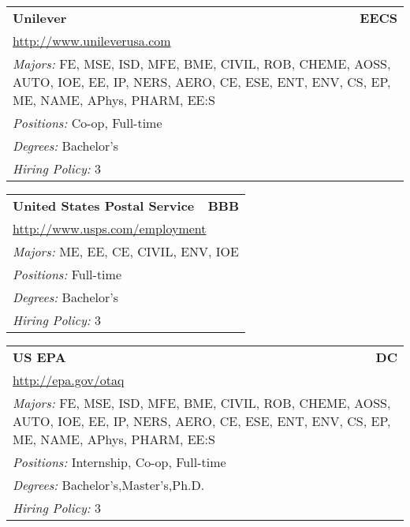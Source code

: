 \documentclass[twoside]{article}
\begin{document}
\begin{center}
\begin{multicols}{3}
\begin{FlushLeft}
\begin{minipage}{\columnwidth}\begin{tabularx}{.95\columnwidth}{Xr}
                 {\Large\bf Unilever} & {\Large\bf EECS}\\
    \multicolumn{2}{p{.95\columnwidth}}{\url{http://www.unileverusa.com}}\\
    \multicolumn{2}{p{.95\columnwidth}}{\emph{Majors:} FE, MSE, ISD, MFE, BME, CIVIL, ROB, CHEME, AOSS, AUTO, IOE, EE, IP, NERS, AERO, CE, ESE, ENT, ENV, CS, EP, ME, NAME, APhys, PHARM, EE:S}\\
    \multicolumn{2}{p{.95\columnwidth}}{\emph{Positions:} Co-op, Full-time}\\
    \multicolumn{2}{p{.95\columnwidth}}{\emph{Degrees:} Bachelor's}\\
    \multicolumn{2}{p{.95\columnwidth}}{\emph{Hiring Policy:} 3}\\
    \end{tabularx}
    
\end{minipage}
 
\begin{minipage}{\columnwidth}\begin{tabularx}{.95\columnwidth}{Xr}
                 {\Large\bf United States Postal Service} & {\Large\bf BBB}\\
    \multicolumn{2}{p{.95\columnwidth}}{\url{http://www.usps.com/employment}}\\
    \multicolumn{2}{p{.95\columnwidth}}{\emph{Majors:} ME, EE, CE, CIVIL, ENV, IOE}\\
    \multicolumn{2}{p{.95\columnwidth}}{\emph{Positions:} Full-time}\\
    \multicolumn{2}{p{.95\columnwidth}}{\emph{Degrees:} Bachelor's}\\
    \multicolumn{2}{p{.95\columnwidth}}{\emph{Hiring Policy:} 3}\\
    \end{tabularx}
    
\end{minipage}
 
\begin{minipage}{\columnwidth}\begin{tabularx}{.95\columnwidth}{Xr}
                 {\Large\bf US EPA} & {\Large\bf DC}\\
    \multicolumn{2}{p{.95\columnwidth}}{\url{http://epa.gov/otaq}}\\
    \multicolumn{2}{p{.95\columnwidth}}{\emph{Majors:} FE, MSE, ISD, MFE, BME, CIVIL, ROB, CHEME, AOSS, AUTO, IOE, EE, IP, NERS, AERO, CE, ESE, ENT, ENV, CS, EP, ME, NAME, APhys, PHARM, EE:S}\\
    \multicolumn{2}{p{.95\columnwidth}}{\emph{Positions:} Internship, Co-op, Full-time}\\
    \multicolumn{2}{p{.95\columnwidth}}{\emph{Degrees:} Bachelor's,Master's,Ph.D.}\\
    \multicolumn{2}{p{.95\columnwidth}}{\emph{Hiring Policy:} 3}\\
    \end{tabularx}
    

\end{minipage}
\end{FlushLeft}
\end{multicols}
\end{center}
\end{document}
